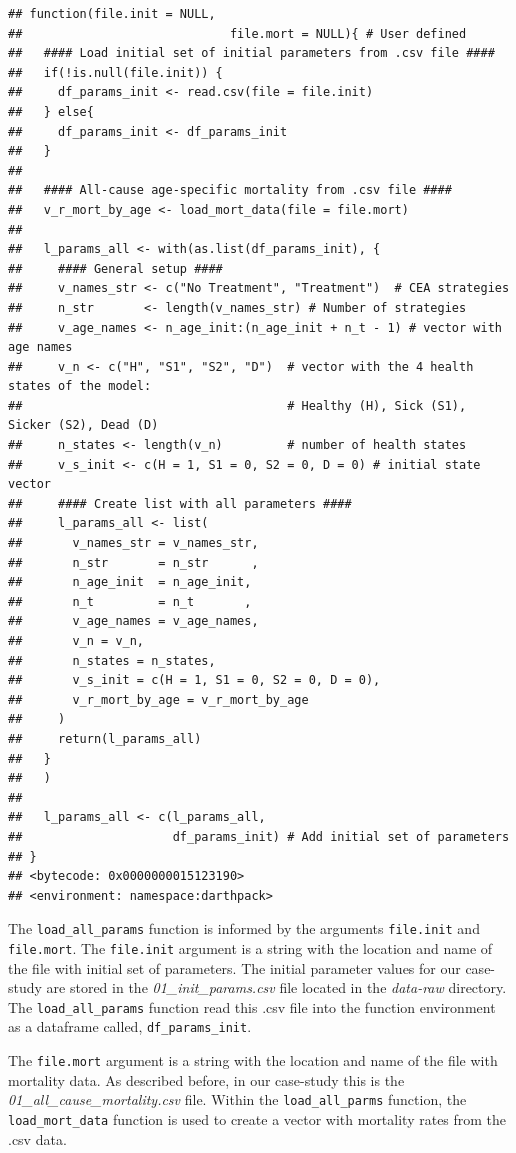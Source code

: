 \documentclass[]{book}
\begin{document}
\begin{verbatim}
## function(file.init = NULL,
##                             file.mort = NULL){ # User defined
##   #### Load initial set of initial parameters from .csv file ####
##   if(!is.null(file.init)) {
##     df_params_init <- read.csv(file = file.init)
##   } else{
##     df_params_init <- df_params_init
##   }
##   
##   #### All-cause age-specific mortality from .csv file ####
##   v_r_mort_by_age <- load_mort_data(file = file.mort)
##   
##   l_params_all <- with(as.list(df_params_init), {
##     #### General setup ####
##     v_names_str <- c("No Treatment", "Treatment")  # CEA strategies
##     n_str       <- length(v_names_str) # Number of strategies
##     v_age_names <- n_age_init:(n_age_init + n_t - 1) # vector with age names
##     v_n <- c("H", "S1", "S2", "D")  # vector with the 4 health states of the model:
##                                     # Healthy (H), Sick (S1), Sicker (S2), Dead (D)
##     n_states <- length(v_n)         # number of health states 
##     v_s_init <- c(H = 1, S1 = 0, S2 = 0, D = 0) # initial state vector
##     #### Create list with all parameters ####
##     l_params_all <- list(
##       v_names_str = v_names_str,
##       n_str       = n_str      ,
##       n_age_init  = n_age_init, 
##       n_t         = n_t       , 
##       v_age_names = v_age_names,
##       v_n = v_n,
##       n_states = n_states,
##       v_s_init = c(H = 1, S1 = 0, S2 = 0, D = 0),
##       v_r_mort_by_age = v_r_mort_by_age
##     )
##     return(l_params_all)
##   }
##   )
##   
##   l_params_all <- c(l_params_all, 
##                     df_params_init) # Add initial set of parameters
## }
## <bytecode: 0x0000000015123190>
## <environment: namespace:darthpack>
\end{verbatim}

The \texttt{load\_all\_params} function is informed by the arguments \texttt{file.init} and \texttt{file.mort}. The \texttt{file.init} argument is a string with the location and name of the file with initial set of parameters. The initial parameter values for our case-study are stored in the \emph{01\_init\_params.csv} file located in the \emph{data-raw} directory. The \texttt{load\_all\_params} function read this .csv file into the function environment as a dataframe called, \texttt{df\_params\_init}.

The \texttt{file.mort} argument is a string with the location and name of the file with mortality data. As described before, in our case-study this is the \emph{01\_all\_cause\_mortality.csv} file. Within the \texttt{load\_all\_parms} function, the \texttt{load\_mort\_data} function is used to create a vector with mortality rates from the .csv data.
\end{document}
